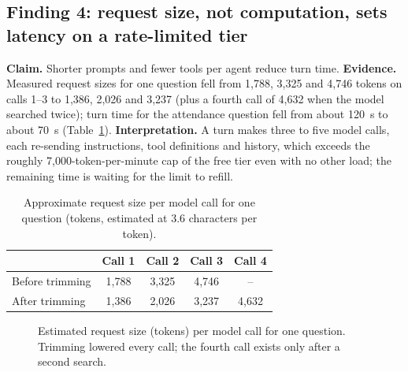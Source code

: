 \documentclass[10pt,a4paper]{article}
\begin{document}
\subsection*{Finding 4: request size, not computation, sets latency on a rate-limited tier}
\textbf{Claim.} Shorter prompts and fewer tools per agent reduce turn time. \textbf{Evidence.} Measured request sizes for one question fell from 1,788, 3,325 and 4,746 tokens on calls 1--3 to 1,386, 2,026 and 3,237 (plus a fourth call of 4,632 when the model searched twice); turn time for the attendance question fell from about 120~s to about 70~s (Table~\ref{tab:tokens}). \textbf{Interpretation.} A turn makes three to five model calls, each re-sending instructions, tool definitions and history, which exceeds the roughly 7,000-token-per-minute cap of the free tier even with no other load; the remaining time is waiting for the limit to refill.

\begin{table}[H]
\centering\small
\caption{Approximate request size per model call for one question (tokens, estimated at 3.6 characters per token).}\label{tab:tokens}
\begin{tabular}{@{}lcccc@{}}
\toprule
 & \textbf{Call 1} & \textbf{Call 2} & \textbf{Call 3} & \textbf{Call 4}\\
\midrule
Before trimming & 1,788 & 3,325 & 4,746 & --\\
After trimming & 1,386 & 2,026 & 3,237 & 4,632\\
\bottomrule
\end{tabular}
\end{table}

\begin{figure}[H]
\centering
{}
\caption{Estimated request size (tokens) per model call for one question. Trimming lowered every call; the fourth call exists only after a second search.}\label{fig:tokbar}
\end{figure}
\end{document}
